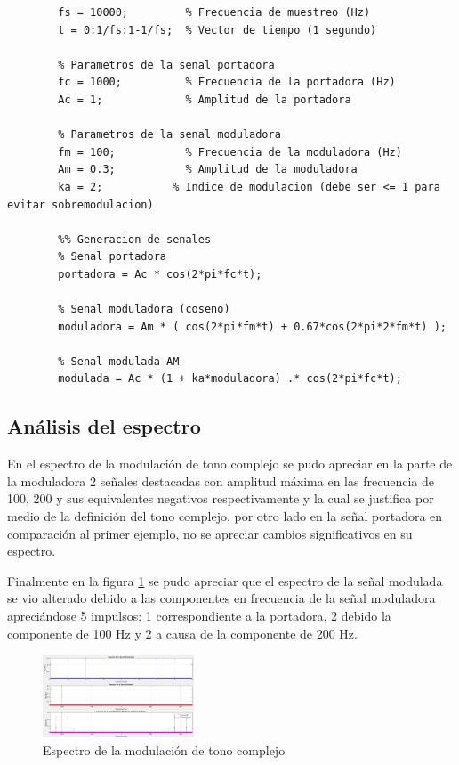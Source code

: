 \documentclass[conference]{IEEEtran}
\begin{document}
	\begin{lstlisting}[caption={Moduladora compleja}, label={lst:moduladora-compleja}, numbers=none]
		%% Parametros de la simulacion
		fs = 10000;         % Frecuencia de muestreo (Hz)
		t = 0:1/fs:1-1/fs;  % Vector de tiempo (1 segundo)
		
		% Parametros de la senal portadora
		fc = 1000;          % Frecuencia de la portadora (Hz)
		Ac = 1;             % Amplitud de la portadora
		
		% Parametros de la senal moduladora
		fm = 100;           % Frecuencia de la moduladora (Hz)
		Am = 0.3;           % Amplitud de la moduladora
		ka = 2;           % Indice de modulacion (debe ser <= 1 para evitar sobremodulacion)
		
		%% Generacion de senales
		% Senal portadora
		portadora = Ac * cos(2*pi*fc*t);
		
		% Senal moduladora (coseno)
		moduladora = Am * ( cos(2*pi*fm*t) + 0.67*cos(2*pi*2*fm*t) );
		
		% Senal modulada AM
		modulada = Ac * (1 + ka*moduladora) .* cos(2*pi*fc*t);
	\end{lstlisting}
	
	\subsection{\textbf{Análisis del espectro}}
	En el espectro de la modulación de tono complejo se pudo apreciar en la parte de la moduladora 2 señales destacadas con amplitud máxima en las frecuencia de 100, 200 y sus equivalentes negativos respectivamente y la cual se justifica por medio de la definición del tono complejo, por otro lado en la señal portadora en comparación al primer ejemplo, no se apreciar cambios significativos en su espectro.
	
	Finalmente en la figura \ref{fig:espectro-complejo} se pudo apreciar que el espectro de la señal modulada se vio alterado debido a las componentes en frecuencia de la señal moduladora apreciándose 5 impulsos: 1 correspondiente a la portadora, 2 debido la componente de 100 Hz y 2 a causa de la componente de 200 Hz.
	
	\begin{figure}[h]
		\centering
		\includegraphics[width=0.4\textwidth]{media/espectro-complejo}
		\caption{Espectro de la modulación de tono complejo}
		\label{fig:espectro-complejo}
	\end{figure}
	
\end{document}
